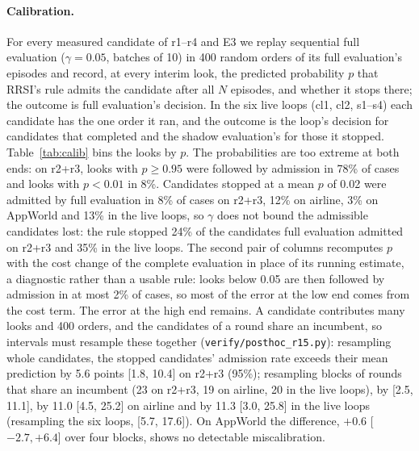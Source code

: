 \documentclass[11pt]{article}
\begin{document}
\paragraph{Calibration.} For every measured candidate of r1--r4 and E3 we replay sequential full evaluation ($\gamma=0.05$, batches of 10) in 400 random orders of its full evaluation's episodes and record, at every interim look, the predicted probability $p$ that RRSI's rule admits the candidate after all $N$ episodes, and whether it stops there; the outcome is full evaluation's decision. In the six live loops (cl1, cl2, s1--s4) each candidate has the one order it ran, and the outcome is the loop's decision for candidates that completed and the shadow evaluation's for those it stopped. Table~\ref{tab:calib} bins the looks by $p$. The probabilities are too extreme at both ends: on r2+r3, looks with $p\ge0.95$ were followed by admission in 78\% of cases and looks with $p<0.01$ in 8\%. Candidates stopped at a mean $p$ of 0.02 were admitted by full evaluation in 8\% of cases on r2+r3, 12\% on airline, 3\% on AppWorld and 13\% in the live loops, so $\gamma$ does not bound the admissible candidates lost: the rule stopped 24\% of the candidates full evaluation admitted on r2+r3 and 35\% in the live loops. The second pair of columns recomputes $p$ with the cost change of the complete evaluation in place of its running estimate, a diagnostic rather than a usable rule: looks below 0.05 are then followed by admission in at most 2\% of cases, so most of the error at the low end comes from the cost term. The error at the high end remains. A candidate contributes many looks and 400 orders, and the candidates of a round share an incumbent, so intervals must resample these together (\texttt{verify/posthoc\_r15.py}): resampling whole candidates, the stopped candidates' admission rate exceeds their mean prediction by 5.6 points [1.8, 10.4] on r2+r3 (95\%); resampling blocks of rounds that share an incumbent (23 on r2+r3, 19 on airline, 20 in the live loops), by [2.5, 11.1], by 11.0 [4.5, 25.2] on airline and by 11.3 [3.0, 25.8] in the live loops (resampling the six loops, [5.7, 17.6]). On AppWorld the difference, $+0.6$ [$-2.7,+6.4$] over four blocks, shows no detectable miscalibration.
\end{document}
